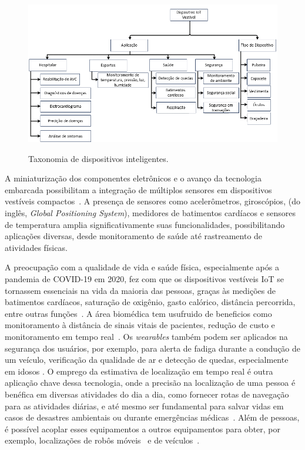 \begin{figure}[ht]
    \centering
    \caption{Taxonomia de dispositivos inteligentes.}
    \includegraphics[width=\textwidth]{Imagens/taxonomia_iot.png}
    \label{fig:taxonomia_iot-label}
\end{figure}

 A miniaturização dos componentes eletrônicos e o avanço da tecnologia embarcada possibilitam a integração de múltiplos sensores em dispositivos vestíveis compactos~\cite{Rahmani2022}. A presença de sensores como acelerômetros, giroscópios,  (do inglês, \textit{Global Positioning System}), medidores de batimentos cardíacos e sensores de temperatura amplia significativamente suas funcionalidades, possibilitando aplicações diversas, desde monitoramento de saúde até rastreamento de atividades físicas.

A preocupação com a qualidade de vida e saúde física, especialmente após a pandemia de COVID-19 em 2020, fez com que os dispositivos vestíveis IoT se tornassem essenciais na vida da maioria das pessoas, graças às medições de batimentos cardíacos, saturação de oxigênio, gasto calórico, distância percorrida, entre outras funções~\cite{Koren2022}. A área biomédica tem usufruido de beneficios como monitoramento à distância de sinais vitais de pacientes, redução de custo e monitoramento em tempo real~\cite{Aledhari2022}. Os \textit{wearables} também podem ser aplicados na segurança dos usuários, por exemplo, para alerta de fadiga durante a condução de um veículo, verificação da qualidade de ar e detecção de quedas, especialmente em idosos \cite{Dian2020}. O emprego da estimativa de localização em tempo real é outra aplicação chave dessa tecnologia, onde a precisão na localização de uma pessoa é benéfica em diversas atividades do dia a dia, como fornecer rotas de navegação para as atividades diárias, e até mesmo ser fundamental para salvar vidas em casos de desastres ambientais ou durante emergências médicas~\cite{Hou2021}. Além de pessoas, é possível acoplar esses equipamentos a outros equipamentos para obter, por exemplo, localizações de robôs móveis~\cite{Tao2021} e de veículos~\cite{Tan2021}.

